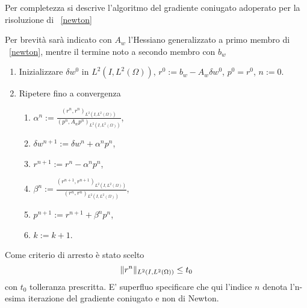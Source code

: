 Per completezza si descrive l'algoritmo del gradiente coniugato adoperato per la risoluzione di ~\eqref{newton}
\begin{algoritmo}
\label{cg}
Per brevità sarà indicato con $ A_w $ l'Hessiano generalizzato a primo membro di ~\eqref{newton}, mentre il termine noto a secondo membro con $ b_w $
\begin{enumerate}
\item Inizializzare $ \delta w^0 $ in $ L^2(I,L^2(\Omega)) $, $ r^0:=b_w-A_w\delta w^0 $, $ p^0=r^0 $, $ n:=0 $.
\item Ripetere fino a convergenza
          \begin{enumerate} 
          \item $\alpha^n:=\frac{(r^n,r^n)_{L^2(I,L^2(\Omega))}}{(p^n,A_wp^n)_{L^2(I,L^2(\Omega))}}$,
          \item $\delta w^{n+1}:=\delta w^n + \alpha^np^n$,
          \item $r^{n+1}:=r^n-\alpha^np^n$,
          \item $\beta^n:=\frac{(r^{n+1},r^{n+1})_{L^2(I,L^2(\Omega))}}{(r^n,r^n)_{L^2(I,L^2(\Omega))}}$,
          \item $p^{n+1}:=r^{n+1} + \beta^np^n$,
          \item $k:=k+1$.
          \end{enumerate}
\end{enumerate}
Come criterio di arresto è stato scelto 
\begin{equation}
\lVert r^n\rVert_{L^2(I,L^2(\Omega))}\le t_0 
\label{eq:CGtoll}
\end{equation}
con $ t_0 $ tolleranza prescritta.
E' superfluo specificare che qui l'indice $ n $ denota l'n-esima iterazione del gradiente coniugato e non di Newton.
\label{CG}
\end{algoritmo} 